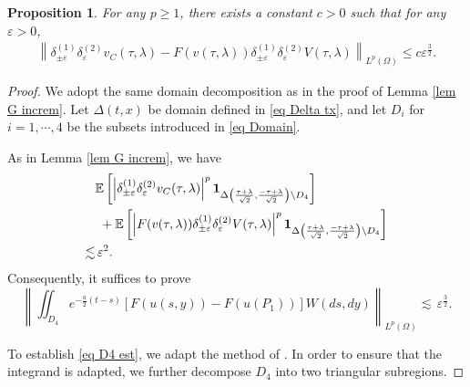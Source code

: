 \documentclass[11pt,reqno]{amsart}
\numberwithin{equation}{section}
\newtheorem{proposition}[theorem]{Proposition}
\newcommand{\1}{{\bf 1}}
\newcommand{\2}{{\bf 2}}
\begin{document}
   \begin{proposition}\label{lem:rec_incr VC}  
    For any $p\ge1$,  there exists a constant $c>0$ such that  for any   $\varepsilon>0$,
\begin{align}
\left \| \delta_{\pm\varepsilon}^{(1)}\delta_{\varepsilon}^{(2)}v_C(\tau, \lambda)-F(v(\tau, \lambda))\delta_{\pm\varepsilon}^{(1)}\delta_{\varepsilon}^{(2)}V(\tau, \lambda)\right\|_{L^p(\Omega)} \le c    \varepsilon^{\frac{3}{2}}.
\end{align}
\end{proposition}
  \begin{proof}         We adopt the same domain decomposition  as in the  proof of Lemma   \ref{lem G increm}.   Let  $\Delta(t, x)$ be domain defined in \eqref{eq Delta tx},  and let   $D_i$ for  $i=1, \cdots, 4$  be the subsets   introduced  in     \eqref{eq Domain}.
  
As in  Lemma \ref{lem G increm}, we have
\begin{equation} 
\begin{split} 
 & \mathbb E\left[ \left|\delta_{\pm\varepsilon}^{(1)}\delta_{\varepsilon}^{(2)}v_C(\tau, \lambda)\right|^p\1_{\Delta\left(\frac{\tau+\lambda}{\sqrt{2}}, \frac{-\tau+\lambda}{\sqrt{2}}\right)\setminus D_4} \right]\\
  &\,\, +
    \mathbb E\left[ \left|F(v(\tau, \lambda))\delta_{\pm\varepsilon}^{(1)}\delta_{\varepsilon}^{(2)}V(\tau, \lambda)\right|^p\1_{\Delta\left(\frac{\tau+\lambda}{\sqrt{2}}, \frac{-\tau+\lambda}{\sqrt{2}}\right)\setminus D_4} \right]\\
     \lesssim &\,   \varepsilon^{2}.
    \end{split}  
\end{equation}
  Consequently, it suffices to prove  
  \begin{equation}\label{eq D4 est}
 \left\|\iint_{D_{4}} e^{-\frac{a}{2}(t-s)}\left[F(u(s,y))-F(u(P_1)) \right]W(ds,dy)\right\|_{L^p(\Omega)}   \lesssim\, \varepsilon^{\frac{3}{2}}. 
  \end{equation} 
  
  To establish \eqref{eq D4 est}, we adapt the method of  \cite[Theorem 1.3]{HOO2024}.   In order to ensure that   the integrand is  adapted, we further decompose  $D_4$ into two triangular subregions.   
  

\end{proof}
\end{document}
